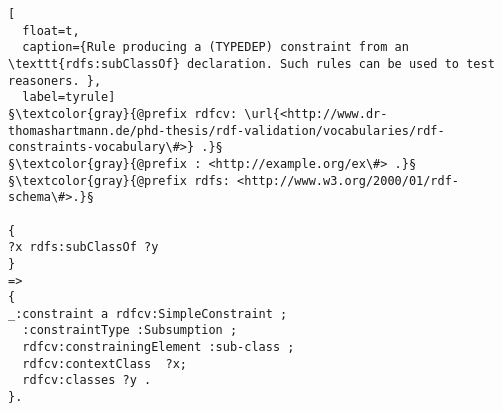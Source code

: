 % 

\begin{lstlisting}[
  float=t,
  caption={Rule producing a (TYPEDEP) constraint from an \texttt{rdfs:subClassOf} declaration. Such rules can be used to test reasoners. },
  label=tyrule]
§\textcolor{gray}{@prefix rdfcv: \url{<http://www.dr-thomashartmann.de/phd-thesis/rdf-validation/vocabularies/rdf-constraints-vocabulary\#>} .}§
§\textcolor{gray}{@prefix : <http://example.org/ex\#> .}§
§\textcolor{gray}{@prefix rdfs: <http://www.w3.org/2000/01/rdf-schema\#>.}§

{
?x rdfs:subClassOf ?y
}
=>
{
_:constraint a rdfcv:SimpleConstraint ;
  :constraintType :Subsumption ;
  rdfcv:constrainingElement :sub-class ;
  rdfcv:contextClass  ?x;
  rdfcv:classes ?y .
}.
\end{lstlisting}

% 
% 
% 
% 
% 

